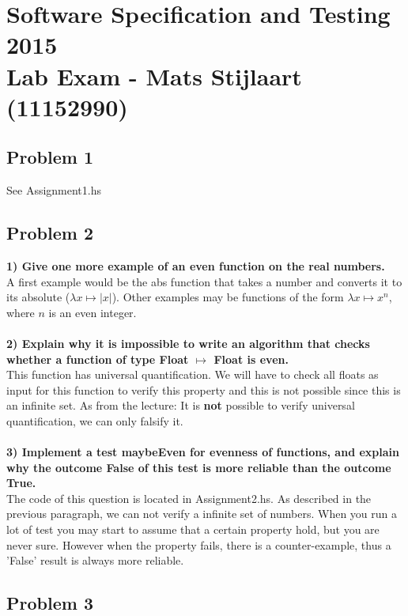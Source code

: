 \section*{Software Specification and Testing 2015 \\ Lab Exam - Mats Stijlaart (11152990)}

\subsection*{Problem 1}

See Assignment1.hs

\subsection*{Problem 2}

\textbf{1) Give one more example of an even function on the real numbers.}\\

\noindent
A first example would be the abs function that takes a number and converts it to its absolute ($\lambda x \mapsto |x|$).
Other examples may be functions of the form $\lambda x \mapsto x^n$, where $n$ is an even integer. \\
\\
\noindent
\textbf{2) Explain why it is impossible to write an algorithm that checks whether a function of type Float $\mapsto$ Float is even.}\\
This function has universal quantification. We will have to check all floats as input for this function to verify this property and this is not possible since this is an infinite set.
As from the lecture: It is \textbf{not} possible to verify universal quantification, we can only falsify it. \\
\\
\noindent
\textbf{3) Implement a test maybeEven for evenness of functions, and explain why the outcome False of this test is more reliable than the outcome True.} \\
The code of this question is located in Assignment2.hs. As described in the previous paragraph, we can not verify a infinite set of numbers.
When you run a lot of test you may start to assume that a certain property hold, but you are never sure.
However when the property fails, there is a counter-example, thus a 'False' result is always more reliable.

\subsection*{Problem 3}

